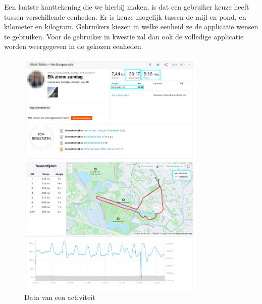 Een laatste kanttekening die we hierbij maken, is dat een gebruiker keuze heeft
tussen verschillende eenheden. Er is keuze mogelijk tussen de mijl en pond, en
kilometer en kilogram. Gebruikers kiezen in welke eenheid ze de applicatie
wensen te gebruiken. Voor de gebruiker in kwestie zal dan ook de volledige
applicatie worden weergegeven in de gekozen eenheden.
\begin{figure}
    \centering
    \includegraphics[width=0.8\textwidth]{fig/VoorbeeldActiviteiten/VoorbeeldActiviteit_Personal.png}
    \caption{Data van een activiteit}\label{fig:activityData}
\end{figure}


